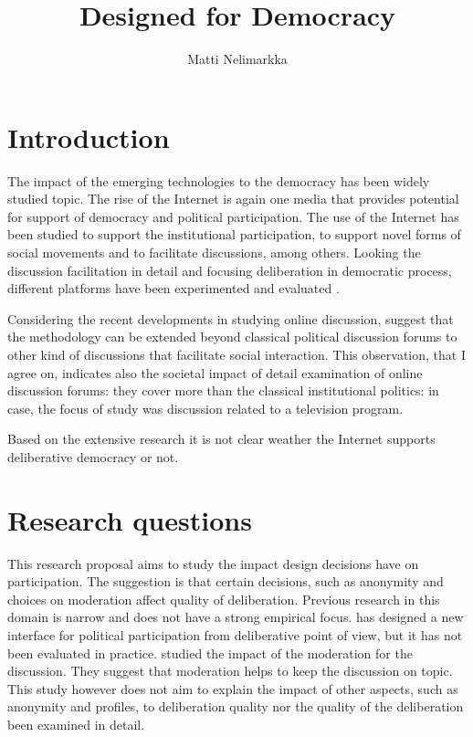 \documentclass[journal,a4paper]{IEEEtran}
\author{Matti Nelimarkka}
\title{Designed for Democracy}
\begin{document}
\maketitle

\setlength{\parindent}{0pt}
\setlength{\parskip}{1ex}


\section{Introduction}

The impact of the emerging technologies to the democracy has been widely studied topic. The rise of the Internet is again one media that provides potential for support of democracy and political participation. The use of the Internet has been studied to support the institutional participation, to support novel forms of social movements and to facilitate discussions, among others. Looking the discussion facilitation in detail and focusing deliberation in democratic process, different platforms have been experimented  and evaluated .

Considering the recent developments in studying online discussion,  suggest that the methodology can be extended beyond classical political discussion forums to other kind of discussions that facilitate social interaction. This observation, that I agree on, indicates also the societal impact of detail examination of online discussion forums: they cover more than the classical institutional politics: in  case, the focus of study was discussion related to a television program.

Based on the extensive research it is not clear weather the Internet supports deliberative democracy or not.

\section{Research questions}

This research proposal aims to study the impact design decisions have on participation. The suggestion is that certain decisions, such as anonymity and choices on moderation affect quality of deliberation. Previous research in this domain is narrow and does not have a strong empirical focus.  has designed a new interface for political participation from deliberative point of view, but it has not been evaluated in practice.   studied the impact of the moderation for the discussion. They suggest that moderation helps to keep the discussion on topic. This study however does not aim to explain the impact of other aspects, such as anonymity and profiles, to deliberation quality nor the quality of the deliberation been examined in detail.
\end{document}

